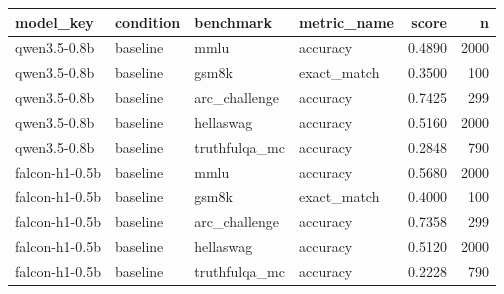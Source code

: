 \begin{tabular}{llllrr}
\toprule
model_key & condition & benchmark & metric_name & score & n \\
\midrule
qwen3.5-0.8b & baseline & mmlu & accuracy & 0.4890 & 2000 \\
qwen3.5-0.8b & baseline & gsm8k & exact_match & 0.3500 & 100 \\
qwen3.5-0.8b & baseline & arc_challenge & accuracy & 0.7425 & 299 \\
qwen3.5-0.8b & baseline & hellaswag & accuracy & 0.5160 & 2000 \\
qwen3.5-0.8b & baseline & truthfulqa_mc & accuracy & 0.2848 & 790 \\
falcon-h1-0.5b & baseline & mmlu & accuracy & 0.5680 & 2000 \\
falcon-h1-0.5b & baseline & gsm8k & exact_match & 0.4000 & 100 \\
falcon-h1-0.5b & baseline & arc_challenge & accuracy & 0.7358 & 299 \\
falcon-h1-0.5b & baseline & hellaswag & accuracy & 0.5120 & 2000 \\
falcon-h1-0.5b & baseline & truthfulqa_mc & accuracy & 0.2228 & 790 \\
\bottomrule
\end{tabular}
